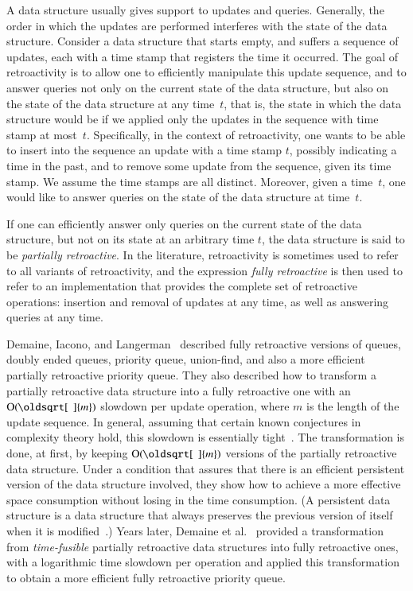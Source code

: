 \documentclass[3p,times,procedia]{elsarticle}
\renewcommand{\sqrt}[2][\mkern8mu]{\mkern-1mu\mathop{\oldsqrt[#1]{#2}}}
\newcommand{\Oh}{\mathrm{O}}
\begin{document}
A data structure usually gives support to updates and queries.  
Generally, the order in which the updates are performed interferes with the state 
of the data structure. 
Consider a data structure that starts empty, and suffers a sequence of updates, 
each with a time stamp that registers the time it occurred. 
The goal of retroactivity is to allow one to efficiently manipulate this update sequence, 
and to answer queries not only on the current state of the data structure, 
but also on the state of the data structure at any time~$t$, that is, 
the state in which the data structure would be if we applied only the updates 
in the sequence with time stamp at most~$t$.
Specifically, in the context of retroactivity, one wants to be able to insert into 
the sequence an update with a time stamp $t$, possibly indicating a time in the past, 
and to remove some update from the sequence, given its time stamp.
We assume the time stamps are all distinct.  Moreover, given a time~$t$, 
one would like to answer queries on the state of the data structure at time~$t$. 

If one can efficiently answer only queries on the current state of the data structure, 
but not on its state at an arbitrary time $t$, the data structure is said to be 
\emph{partially retroactive}.  In the literature, retroactivity is sometimes used 
to refer to all variants of retroactivity, and the expression \emph{fully retroactive}
is then used to refer to an implementation that provides the complete set of retroactive
operations: insertion and removal of updates at any time, as well as answering queries 
at any time.  

Demaine, Iacono, and Langerman~\cite{DemaineIL2007} described fully 
retroactive versions of queues, doubly ended queues, priority queue, union-find, 
and also a more efficient partially retroactive priority queue.
They also described how to transform a partially retroactive data structure into 
a fully retroactive one with an $\Oh(\sqrt{m})$ slowdown per update operation, 
where $m$ is the length of the update sequence. 
In general, assuming that certain known conjectures in complexity theory hold, 
this slowdown is essentially tight~\cite{ChenDGWXY2018}.
The transformation is done, at first, by keeping $\Oh(\sqrt{m})$ versions of the 
partially retroactive data structure. 
Under a condition that assures that there is an efficient persistent version 
of the data structure involved, they show how to achieve a more effective space
consumption without losing in the time consumption. 
(A persistent data structure is a data structure that always preserves the 
previous version of itself when it is modified~\cite{DriscollSST1989}.)
Years later, Demaine et al.~\cite{DemaineKLSY2015} provided a transformation 
from \emph{time-fusible} partially retroactive data structures into fully
retroactive ones, with a logarithmic time slowdown per operation and applied
this transformation to obtain a more efficient fully retroactive priority queue.
\end{document}
